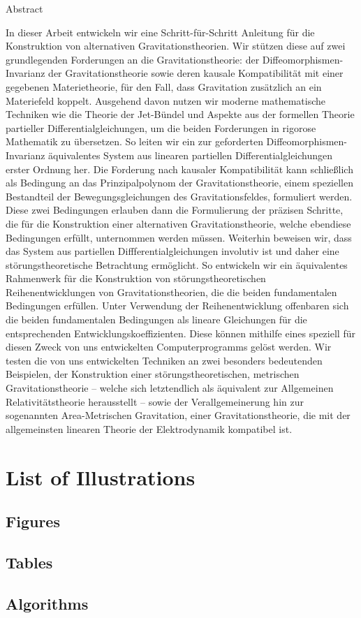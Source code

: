 \documentclass[a4paper,12pt, DIV=14, BCOR=5mm, twoside, headsepline, numbers=noenddot]{scrbook}
\makeatletter
\providecommand\phantomsection{}
\newcommand\listofillustrations{
    \chapter*{List of Illustrations}
    \phantomsection
    \section*{Figures}
    \phantomsection
    \@starttoc{lof}%
    \bigskip
    \section*{Tables}%
    \phantomsection
    \@starttoc{lot}%
    \bigskip
    \section*{Algorithms}%
    \phantomsection
    \@starttoc{loa}
    }
\newenvironment{abstract}{%
  \titlepage%
  \null\vfil%
  \begin{center}\normalfont\usekomafont{disposition}Abstract\end{center}%
}{%
  \par
  \vfil\null%
  \endtitlepage%
}
\makeatother
\begin{document}
\begin{abstract}
In dieser Arbeit entwickeln wir eine Schritt-für-Schritt Anleitung für die Konstruktion von alternativen Gravitationstheorien. Wir stützen diese auf zwei grundlegenden Forderungen an die Gravitationstheorie: der Diffeomorphismen-Invarianz der Gravitationstheorie sowie deren kausale Kompatibilität mit einer gegebenen Materietheorie, für den Fall, dass Gravitation zusätzlich an ein Materiefeld koppelt. Ausgehend davon nutzen wir moderne mathematische Techniken wie die Theorie der Jet-Bündel und Aspekte aus der formellen Theorie partieller Differentialgleichungen, um die beiden Forderungen in rigorose Mathematik zu übersetzen. So leiten wir ein zur geforderten Diffeomorphismen-Invarianz äquivalentes System aus linearen partiellen Differentialgleichungen erster Ordnung her. Die Forderung nach kausaler Kompatibilität kann schließlich als Bedingung an das Prinzipalpolynom der Gravitationstheorie, einem speziellen Bestandteil der Bewegungsgleichungen des Gravitationsfeldes, formuliert werden. 
Diese zwei Bedingungen erlauben dann die Formulierung der präzisen Schritte, die für die Konstruktion einer alternativen Gravitationstheorie, welche ebendiese Bedingungen erfüllt, unternommen werden müssen.
Weiterhin beweisen wir, dass das System aus partiellen Diffferentialgleichungen involutiv ist und daher eine störungstheoretische Betrachtung ermöglicht. So entwickeln wir ein äquivalentes Rahmenwerk für die Konstruktion von störungstheoretischen Reihenent{\-}wicklungen von Gravitationstheorien, die die beiden fundamentalen Bedingungen erfüllen. Unter Verwendung der Reihenentwicklung offenbaren sich die beiden fundamentalen Bedingungen als lineare Gleichungen für die entsprechenden Entwicklungskoeffizienten. Diese können mithilfe eines speziell für diesen Zweck von uns entwickelten Computerprogramms gelöst werden.
Wir testen die von uns entwickelten Techniken an zwei besonders bedeutenden Beispielen, der Konstruktion einer störungstheoretischen, metrischen Gravitationstheorie -- welche sich letztendlich als äquivalent zur Allgemeinen Relativitätstheorie herausstellt -- sowie der Verallgemeinerung hin zur sogenannten Area-Metrischen Gravitation, einer Gravitationstheorie, die mit der allgemeinsten linearen Theorie der Elektrodynamik kompatibel ist.
\end{abstract}

\tableofcontents

\listofillustrations

\listoflistings
\end{document}
